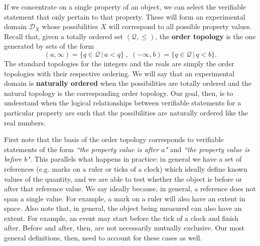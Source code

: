 \documentclass{article}
\newcommand{\edomain}[1][D] {\mathcal{#1}} %
\newcommand{\statement}[1] {\emph{``#1"}}
\begin{document}
If we concentrate on a single property of an object, we can select the verifiable statement that only pertain to that property. These will form an experimental domain $\edomain_X$ whose possibilities $X$ will correspond to all possible property values. Recall that, given a totally ordered set $(\mathcal{Q}, \leq)$, the \textbf{order topology} is the one generated by sets of the form $$(a, \infty) = \{q \in \mathcal{Q} \, | \, a < q\} \;,\; (-\infty, b) = \{q \in \mathcal{Q} \, | \, q < b\}.$$
The standard topologies for the integers and the reals are simply the order topologies with their respective ordering. We will say that an experimental domain is \textbf{naturally ordered} when the possibilities are totally ordered and the natural topology is the corresponding order topology. Our goal, then, is to understand when the logical relationships between verifiable statements for a particular property are such that the possibilities are naturally ordered like the real numbers.

First note that the basis of the order topology corresponds to verifiable statements of the form \statement{the property value is after $a$} and \statement{the property value is before $b$}. This parallels what happens in practice: in general we have a set of references (e.g. marks on a ruler or ticks of a clock) which ideally define known values of the quantity, and we are able to test whether the object is before or after that reference value. We say ideally because, in general, a reference does not span a single value. For example, a mark on a ruler will also have an extent in space. Also note that, in general, the object being measured can also have an extent. For example, an event may start before the tick of a clock and finish after. Before and after, then, are not necessarily mutually exclusive. Our most general definitions, then, need to account for these cases as well.
\end{document}
